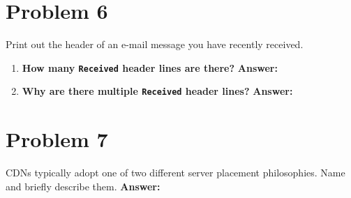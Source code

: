 \documentclass[12pt, letterpaper]{article}
\newcommand{\problem}[1]{\section*{Problem #1}}
\newcommand{\answer}{\noindent\textbf{Answer:}\par\vspace{1em}}
\begin{document}
\problem{6}
Print out the header of an e-mail message you have recently received.

\begin{enumerate}[label=\alph*.]
	\item \textbf{How many \texttt{Received} header lines are there?} \newline
	      \answer

	\item \textbf{Why are there multiple \texttt{Received} header lines?} \newline
	      \answer
\end{enumerate}


\problem{7}
CDNs typically adopt one of two different server placement philosophies. Name and briefly describe them. \newline
\answer
\end{document}
